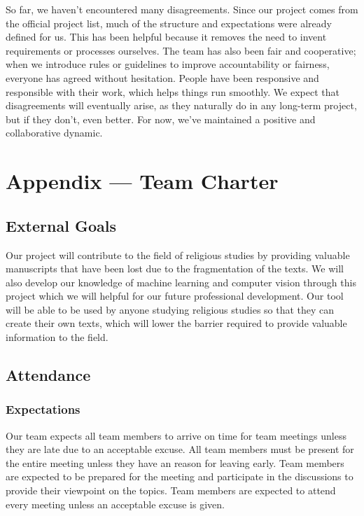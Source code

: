 \documentclass{article}
\begin{document}
\hspace{2em} So far, we haven’t encountered many disagreements. Since our project comes from the official project list, much of the structure and expectations were already defined for us. This has been helpful because it removes the need to invent requirements or processes ourselves. The team has also been fair and cooperative; when we introduce rules or guidelines to improve accountability or fairness, everyone has agreed without hesitation. People have been responsive and responsible with their work, which helps things run smoothly. We expect that disagreements will eventually arise, as they naturally do in any long-term project, but if they don’t, even better. For now, we’ve maintained a positive and collaborative dynamic.

\newpage{}

\section*{Appendix --- Team Charter}


\subsection*{External Goals}

Our project will contribute to the field of religious studies by providing valuable manuscripts that have been lost due to the fragmentation of the texts. We will also develop our knowledge 
of machine learning and computer vision through this project which we will helpful for our future professional development. Our tool will be able to be used by anyone studying 
religious studies so that they can create their own texts, which will lower the barrier required to provide valuable information to the field.

\subsection*{Attendance}

\subsubsection*{Expectations}

Our team expects all team members to arrive on time for team meetings unless they are late due to an acceptable excuse. All team members must be present for the entire meeting unless they have an reason for leaving early. 
Team members are expected to be prepared for the meeting and participate in the discussions to provide their viewpoint on the topics. Team members are expected to attend every meeting unless an acceptable excuse is given.
\end{document}
